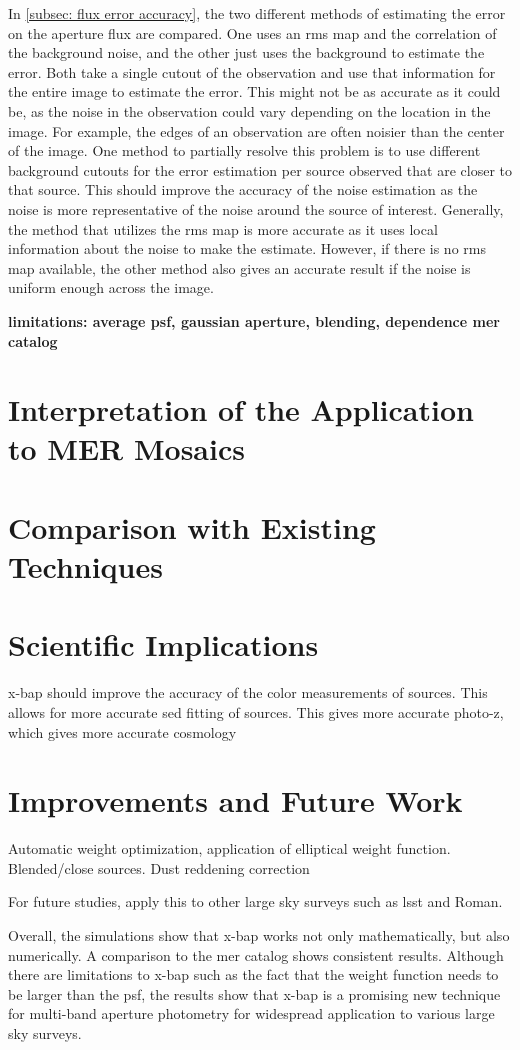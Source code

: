 In \autoref{subsec: flux error accuracy}, the two different methods of estimating the error on the aperture flux are compared. One uses an \gls{rms} map and the correlation of the background noise, and the other just uses the background to estimate the error. Both take a single cutout of the observation and use that information for the entire image to estimate the error. This might not be as accurate as it could be, as the noise in the observation could vary depending on the location in the image. For example, the edges of an observation are often noisier than the center of the image. One method to partially resolve this problem is to use different background cutouts for the error estimation per source observed that are closer to that source. This should improve the accuracy of the noise estimation as the noise is more representative of the noise around the source of interest. Generally, the method that utilizes the \gls{rms} map is more accurate as it uses local information about the noise to make the estimate. However, if there is no \gls{rms} map available, the other method also gives an accurate result if the noise is uniform enough across the image.

\textbf{limitations: average psf, gaussian aperture, blending, dependence mer catalog}

\section{Interpretation of the Application to MER Mosaics}
\section{Comparison with Existing Techniques}

\section{Scientific Implications}

\gls{x-bap} should improve the accuracy of the color measurements of sources. This allows for more accurate \gls{sed} fitting of sources. This gives more accurate photo-z, which gives more accurate cosmology

\section{Improvements and Future Work}

Automatic weight optimization, application of elliptical weight function. Blended/close sources. Dust reddening correction

For future studies, apply this to other large sky surveys such as \gls{lsst} and Roman. 

Overall, the simulations show that \gls{x-bap} works not only mathematically, but also numerically. A comparison to the \gls{mer} catalog shows consistent results. Although there are limitations to \gls{x-bap} such as the fact that the weight function needs to be larger than the \gls{psf}, the results show that \gls{x-bap} is a promising new technique for multi-band aperture photometry for widespread application to various large sky surveys.  

\newpage